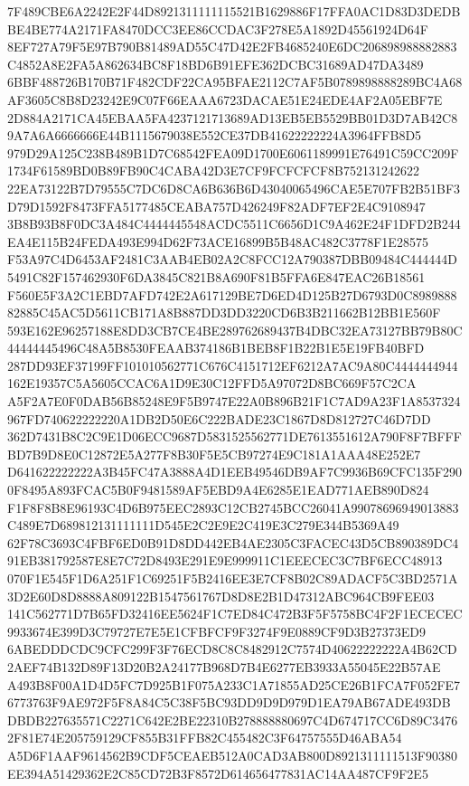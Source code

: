 \documentclass[UTF8,fontset=fandol,zihao=-4,a4paper]{ctexart}
\begin{document}
{{7F489CBE6A2242E2F44D8921311111115521B1629886F17FFA0AC1D83D3DEDBBE4BE774A2171FA8470DCC3EE86CCDAC3F278E5A1892D45561924D64F
8EF727A79F5E97B790B81489AD55C47D42E2FB4685240E6DC206898988882883C4852A8E2FA5A862634BC8F18BD6B91EFE362DCBC31689AD47DA3489
6BBF488726B170B71F482CDF22CA95BFAE2112C7AF5B0789898888289BC4A68AF3605C8B8D23242E9C07F66EAAA6723DACAE51E24EDE4AF2A05EBF7E
2D884A2171CA45EBAA5FA4237121713689AD13EB5EB5529BB01D3D7AB42C89A7A6A6666666E44B1115679038E552CE37DB41622222224A3964FFB8D5
979D29A125C238B489B1D7C68542FEA09D1700E6061189991E76491C59CC209F1734F61589BD0B89FB90C4CABA42D3E7CF9FCFCFCF8B752131242622
22EA73122B7D79555C7DC6D8CA6B636B6D43040065496CAE5E707FB2B51BF3D79D1592F8473FFA5177485CEABA757D426249F82ADF7EF2E4C9108947
3B8B93B8F0DC3A484C4444445548ACDC5511C6656D1C9A462E24F1DFD2B244EA4E115B24FEDA493E994D62F73ACE16899B5B48AC482C3778F1E28575
F53A97C4D6453AF2481C3AAB4EB02A2C8FCC12A790387DBB09484C444444D5491C82F157462930F6DA3845C821B8A690F81B5FFA6E847EAC26B18561
F560E5F3A2C1EBD7AFD742E2A617129BE7D6ED4D125B27D6793D0C898988882885C45AC5D5611CB171A8B887DD3DD3220CD6B3B211662B12BB1E560F
593E162E96257188E8DD3CB7CE4BE289762689437B4DBC32EA73127BB79B80C44444445496C48A5B8530FEAAB374186B1BEB8F1B22B1E5E19FB40BFD
287DD93EF37199FF101010562771C676C4151712EF6212A7AC9A80C4444444944162E19357C5A5605CCAC6A1D9E30C12FFD5A97072D8BC669F57C2CA
A5F2A7E0F0DAB56B85248E9F5B9747E22A0B896B21F1C7AD9A23F1A8537324967FD740622222220A1DB2D50E6C222BADE23C1867D8D812727C46D7DD
362D7431B8C2C9E1D06ECC9687D5831525562771DE7613551612A790F8F7BFFFBD7B9D8E0C12872E5A277F8B30F5E5CB97274E9C181A1AAA48E252E7
D641622222222A3B45FC47A3888A4D1EEB49546DB9AF7C9936B69CFC135F2900F8495A893FCAC5B0F9481589AF5EBD9A4E6285E1EAD771AEB890D824
F1F8F8B8E96193C4D6B975EEC2893C12CB2745BCC26041A99078696949013883C489E7D689812131111111D545E2C2E9E2C419E3C279E344B5369A49
62F78C3693C4FBF6ED0B91D8DD442EB4AE2305C3FACEC43D5CB890389DC491EB381792587E8E7C72D8493E291E9E999911C1EEECEC3C7BF6ECC48913
070F1E545F1D6A251F1C69251F5B2416EE3E7CF8B02C89ADACF5C3BD2571A3D2E60D8D8888A809122B1547561767D8D8E2B1D47312ABC964CB9FEE03
141C562771D7B65FD32416EE5624F1C7ED84C472B3F5F5758BC4F2F1ECECEC9933674E399D3C79727E7E5E1CFBFCF9F3274F9E0889CF9D3B27373ED9
6ABEDDDCDC9CFC299F3F76ECD8C8C8482912C7574D40622222222A4B62CD2AEF74B132D89F13D20B2A24177B968D7B4E6277EB3933A55045E22B57AE
A493B8F00A1D4D5FC7D925B1F075A233C1A71855AD25CE26B1FCA7F052FE76773763F9AE972F5F8A84C5C38F5BC93DD9D9D979D1EA79AB67ADE493DB
DBDB227635571C2271C642E2BE22310B278888880697C4D674717CC6D89C34762F81E74E205759129CF855B31FFB82C455482C3F64757555D46ABA54
A5D6F1AAF9614562B9CDF5CEAEB512A0CAD3AB800D8921311111513F90380EE394A51429362E2C85CD72B3F8572D614656477831AC14AA487CF9F2E5
}}
\end{document}
